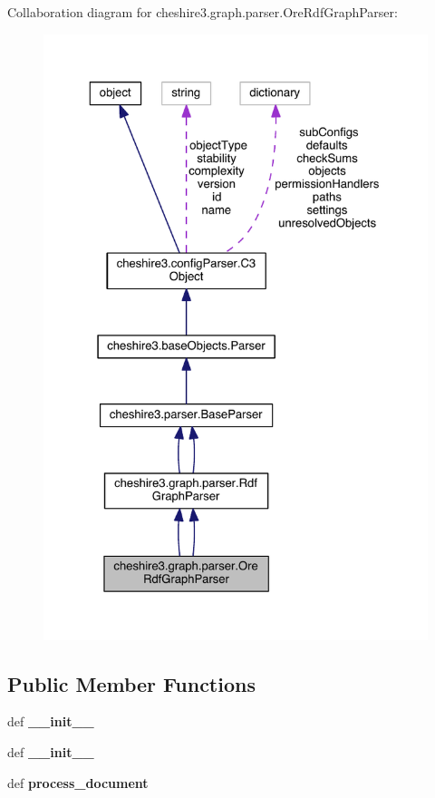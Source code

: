 Collaboration diagram for cheshire3.\-graph.\-parser.\-Ore\-Rdf\-Graph\-Parser\-:
\nopagebreak
\begin{figure}[H]
\begin{center}
\leavevmode
\includegraphics[width=325pt]{classcheshire3_1_1graph_1_1parser_1_1_ore_rdf_graph_parser__coll__graph}
\end{center}
\end{figure}
\subsection*{Public Member Functions}
\begin{DoxyCompactItemize}
\item 
\hypertarget{classcheshire3_1_1graph_1_1parser_1_1_ore_rdf_graph_parser_a04ef21c55bc17cebb6c486d224ebbd50}{def {\bfseries \-\_\-\-\_\-init\-\_\-\-\_\-}}\label{classcheshire3_1_1graph_1_1parser_1_1_ore_rdf_graph_parser_a04ef21c55bc17cebb6c486d224ebbd50}

\item 
\hypertarget{classcheshire3_1_1graph_1_1parser_1_1_ore_rdf_graph_parser_a04ef21c55bc17cebb6c486d224ebbd50}{def {\bfseries \-\_\-\-\_\-init\-\_\-\-\_\-}}\label{classcheshire3_1_1graph_1_1parser_1_1_ore_rdf_graph_parser_a04ef21c55bc17cebb6c486d224ebbd50}

\item 
\hypertarget{classcheshire3_1_1graph_1_1parser_1_1_ore_rdf_graph_parser_a453f0fe1186c20c1a643efb83a4fae1e}{def {\bfseries process\-\_\-document}}\label{classcheshire3_1_1graph_1_1parser_1_1_ore_rdf_graph_parser_a453f0fe1186c20c1a643efb83a4fae1e}

\end{DoxyCompactItemize}
